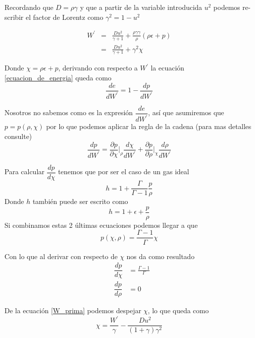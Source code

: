 \documentclass[12pt,a4paper]{book}
\begin{document}
Recordando que $D=\rho \gamma$ y que a partir de la variable introducida $u^{2}$ podemos re-scribir el factor de Lorentz como $\gamma^{2} = 1- u^{2}$

\begin{eqnarray}\label{W_prima}
\nonumber W^{'}&=&\frac{D u^{2}}{\gamma + 1}
+\frac{\rho\gamma \gamma}{ \rho }\left(\rho \epsilon + p \right)\\
&=& \frac{D u^{2}}{\gamma + 1} + \gamma^{2} \chi
\end{eqnarray}

Donde $\chi=\rho \epsilon + p$, derivando con respecto a $W^{'}$ la ecuación \ref{ecuacion_de_energia} queda como
\begin{equation}\label{derivada_E_W}
\dfrac{de}{dW^{'}}=1-\dfrac{dp}{dW^{'}}
\end{equation}

Nosotros no sabemos como es la expresión $\dfrac{de}{dW^{'}}$, así que asumiremos que $p=p(\rho, \chi)$ por lo que podemos aplicar la regla de la cadena (para mas detalles consulte)
\begin{equation}\label{cadena}
\dfrac{dp}{dW^{'}}=\dfrac{\partial p}{\partial\chi}\Bigg |_{\rho} \dfrac{d\chi}{dW^{'}} + \dfrac{\partial p}{\partial \rho}\Big |_{\chi} \dfrac{d \rho}{d W^{'}}
\end{equation}

Para calcular $\dfrac{dp}{d\chi}$ tenemos que por ser el caso de un gas ideal
\begin{equation} \label{entalpia_funcion_presion_densidad}
h=1+\frac{\Gamma}{\Gamma-1}\frac{p}{\rho}
\end{equation}
Donde $h$ también puede ser escrito como
\begin{equation}
h=1+\epsilon+\frac{p}{\rho}
\end{equation}
Si combinamos estas 2 últimas ecuaciones podemos llegar a que 
\begin{equation}
p(\chi,\rho)=\frac{\Gamma-1}{\Gamma}\chi
\end{equation}

Con lo que al derivar con respecto de $\chi$ nos da como resultado
\begin{eqnarray}\label{der_presion}
& \dfrac{d p}{d \chi}&=\frac{\Gamma-1}{\Gamma}\\ &\dfrac{d p}{d \rho}&= 0
\end{eqnarray}

De la ecuación \ref{W_prima} podemos despejar $\chi$, lo que queda como
\begin{equation}
\chi=\frac{W^{'}}{\gamma}- \frac{D u^{2}}{(1+\gamma)\gamma^{2}}
\end{equation}
\end{document}
